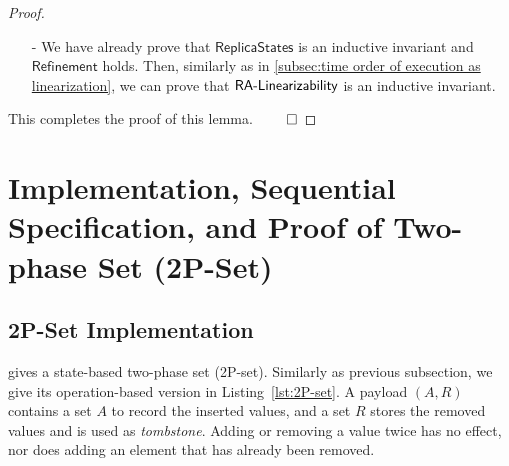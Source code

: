 \begin {proof}
\begin{itemize}
\begin{itemize}
    Therefore, we know that $S' = \abstate'$, and the case of the effector $(a,V_a)$ and the $\alabelshort[{\tt write}]{a,V_a,S_1}$ operation of the specification $\specMVReg$ holds.

    \item[-] Whenever the query-update $\alabelshort[{\tt remove}]{a}$ executes atSource on a state $S$, the query $\alabellong[{\tt readIds}]{}{R}{}$ introduced by the query-update rewriting should be enabled in the specification state $\refmap(S)=\abstate=S$. This clearly holds because the the computation of $R$ in {\tt atSource} returns $S$, and the result of $\alabelshort[readIds]{}$ in the specification state $\abstate = S$ also returns $S$.

    \item[-] Applying the query $\alabelshort[read]{}$ on the replica state $S$ should result in the same return value as applying the same query in the context of the specification on the same state $\abstate = \refmap(S)$, which again holds trivially.
    \end{itemize}

\item[-] We have already prove that $\mathsf{ReplicaStates}$ is an inductive invariant and $\mathsf{Refinement}$ holds. Then, similarly as in \sectionautorefname \ref{subsec:time order of execution as linearization}, we can prove that $\mathsf{RA\text{-}Linearizability{}}$ is an inductive invariant.
\end{itemize}

This completes the proof of this lemma. $\qed$
\end {proof}








\section{Implementation, Sequential Specification, and Proof of Two-phase Set (2P-Set)}
\label{sec:implementation, sequential specification, and proof of two-phase set (2P-set)}


\subsection{2P-Set Implementation}
\label{subsec:2P-set implementation}

\cite{ShapiroPBZ11} gives a state-based two-phase set (2P-set). Similarly as previous subsection, we give its operation-based version in Listing~\ref{lst:2P-set}. A payload $(A,R)$ contains a set $A$ to record the inserted values, and a set $R$ stores the removed values and is used as \emph{tombstone}. Adding or removing a value twice has no effect, nor does adding an element that has already been removed.


